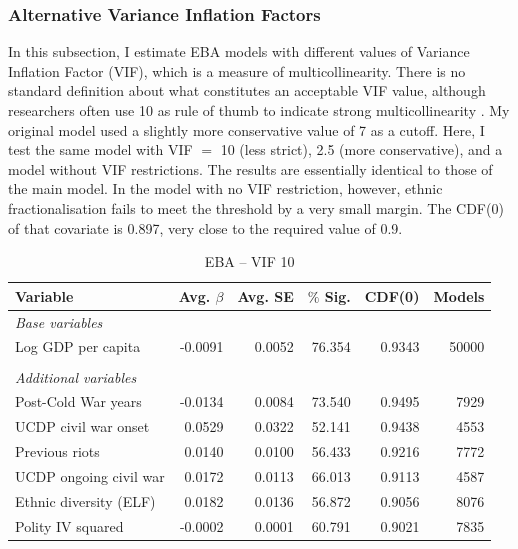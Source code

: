 \subsubsection{Alternative Variance Inflation Factors}

In this subsection, I estimate EBA models with different values of Variance Inflation Factor (VIF), which is a measure of multicollinearity. There is no standard definition about what constitutes an acceptable VIF value, although researchers often use 10 as rule of thumb to indicate strong multicollinearity \citep[674]{o2007caution}. My original model used a slightly more conservative value of 7 as a cutoff. Here, I test the same model with VIF $=$ 10 (less strict), 2.5 (more conservative), and a model without VIF restrictions. The results are essentially identical to those of the main model. In the model with no VIF restriction, however, ethnic fractionalisation fails to meet the threshold by a very small margin. The CDF(0) of that covariate is 0.897, very close to the required value of 0.9. 

\vspace{1cm}

\begin{table}[H]
\centering
\begin{tabular}{lrrrrr}
\hline
\textbf{Variable} & \textbf{Avg. $\beta$} & \textbf{Avg. SE} & \textbf{$\%$ Sig.} & \textbf{CDF(0)} & \textbf{Models} \\ \hline
\textit{Base variables} &  &  &  &  &  \\
Log GDP per capita & -0.0091 & 0.0052 & 76.354 & 0.9343 & 50000 \\
 &  &  &  &  &  \\
\textit{Additional variables} &  &  &  &  &  \\
Post-Cold War years & -0.0134 & 0.0084 & 73.540 & 0.9495 & 7929 \\
UCDP civil war onset & 0.0529 & 0.0322 & 52.141 & 0.9438 & 4553 \\
Previous riots & 0.0140 & 0.0100 & 56.433 & 0.9216 & 7772 \\
UCDP ongoing civil war & 0.0172 & 0.0113 & 66.013 & 0.9113 & 4587 \\
Ethnic diversity (ELF) & 0.0182 & 0.0136 & 56.872 & 0.9056 & 8076 \\
Polity IV squared & -0.0002 & 0.0001 & 60.791 & 0.9021 & 7835 \\ \hline
\end{tabular}
\caption{EBA -- VIF 10}
\label{tab:mk-high-vif}
\end{table}


